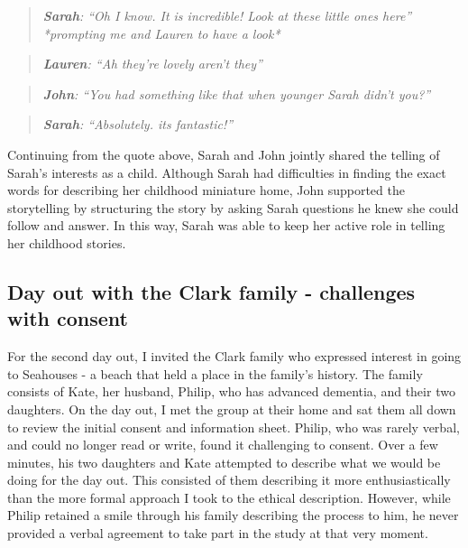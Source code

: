 \begin{quote}
\textit{    \textbf{Sarah}: ``Oh I know. It is incredible! Look at these little ones here'' *prompting me and Lauren to have a look*}

\end{quote}

\begin{quote}
\textit{    \textbf{Lauren}: ``Ah they're lovely aren't they''
}
\end{quote}

\begin{quote}
\textit{    \textbf{John}: ``You had something like that when younger Sarah didn't you?''
}
\end{quote}

\begin{quote}
\textit{    \textbf{Sarah}: ``Absolutely. its fantastic!''
}
\end{quote}

Continuing from the quote above, Sarah and John jointly shared the telling of Sarah's interests as a child. Although Sarah had difficulties in finding the exact words for describing her childhood miniature home, John supported the storytelling by structuring the story by asking Sarah questions he knew she could follow and answer. In this way, Sarah was able to keep her active role in telling her childhood stories.


\subsection{Day out with the Clark family - challenges with consent}
\label{ClarkFamily}
For the second day out, I invited the Clark family who expressed interest in going to Seahouses - a beach that held a place in the family's history. The family consists of Kate, her husband, Philip, who has advanced dementia, and their two daughters. On the day out, I met the group at their home and sat them all down to review the initial consent and information sheet. Philip, who was rarely verbal, and could no longer read or write, found it challenging to consent. Over a few minutes, his two daughters and Kate attempted to describe what we would be doing for the day out. This consisted of them describing it more enthusiastically than the more formal approach I took to the ethical description. However, while Philip retained a smile through his family describing the process to him, he never provided a verbal agreement to take part in the study at that very moment.

